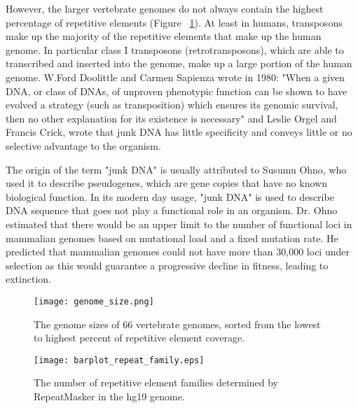 However, the larger vertebrate genomes do not always contain the highest percentage of repetitive elements (Figure ~\ref{fig:genome_size}). At least in humans, transposons make up the majority of the repetitive elements that make up the human genome. In particular class I transposons (retrotransposons), which are able to transcribed and inserted into the genome, make up a large portion of the human genome. W.Ford Doolittle and Carmen Sapienza wrote in 1980\cite{doolittle1980selfish}: "When a given DNA, or class of DNAs, of unproven phenotypic function can be shown to have evolved a strategy (such as transposition) which ensures its genomic survival, then no other explanation for its existence is necessary" and Leslie Orgel and Francis Crick, wrote that junk DNA has little specificity and conveys little or no selective advantage to the organism\cite{orgel1980selfish}.

The origin of the term "junk DNA" is usually attributed to Susumu Ohno, who used it to describe pseudogenes, which are gene copies that have no known biological function. In its modern day usage, "junk DNA" is used to describe DNA sequence that goes not play a functional role in an organism. Dr. Ohno estimated that there would be an upper limit to the number of functional loci in mammalian genomes based on mutational load and a fixed mutation rate. He predicted that mammalian genomes could not have more than 30,000 loci under selection as this would guarantee a progressive decline in fitness, leading to extinction.

\begin{figure}[h]
   \centering
   \texttt{[image: genome\_size.png]}
   \caption[Vertebrate genomes sizes]{The genome sizes of 66 vertebrate genomes, sorted from the lowest to highest percent of repetitive element coverage\cite{tang2014gensize}.}
   \label{fig:genome_size}
\end{figure}

\begin{figure}[h]
   \centering
   \texttt{[image: barplot\_repeat\_family.eps]}
   \caption[Tally of repetitive element families in the hg19 genome]{The number of repetitive element families determined by RepeatMasker in the hg19 genome.}
   \label{fig:repeat_family}
\end{figure}

